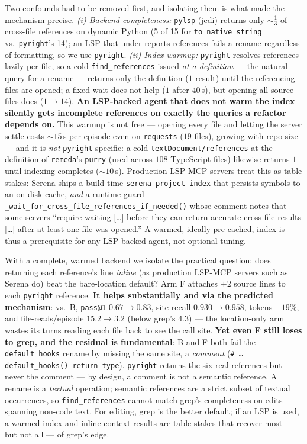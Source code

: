 \documentclass[11pt]{article}
\newcommand{\code}[1]{\texttt{#1}}
\begin{document}
Two confounds had to be removed first, and isolating them is what made the mechanism precise.
\emph{(i) Backend completeness:} \code{pylsp} (jedi) returns only ${\sim}\tfrac13$ of cross-file
references on dynamic Python (5 of 15 for \code{to\_native\_string} vs.\ \code{pyright}'s 14); an LSP
that under-reports references fails a rename regardless of formatting, so we use \code{pyright}.
\emph{(ii) Index warmup:} \code{pyright} resolves references lazily per file, so a cold
\code{find\_references} issued \emph{at a definition} --- the natural query for a rename --- returns only
the definition ($1$ result) until the referencing files are opened; a fixed wait does not help ($1$ after
$40$\,s), but opening all source files does ($1\!\to\!14$). \textbf{An LSP-backed agent that does not warm
the index silently gets incomplete references on exactly the queries a refactor depends on.} This warmup
is not free --- opening every file and letting the server settle costs ${\sim}15$\,s per episode even on
\code{requests} ($19$ files), growing with repo size --- and it is \emph{not} \code{pyright}-specific: a
cold \code{textDocument/references} at the definition of \code{remeda}'s \code{purry} (used across $108$
TypeScript files) likewise returns $1$ until indexing completes (${\sim}10$\,s). Production LSP-MCP servers
treat this as table stakes: Serena ships a build-time \code{serena project index} that persists symbols to
an on-disk cache, \emph{and} a runtime guard \code{\_wait\_for\_cross\_file\_references\_if\_needed()} whose
comment notes that some servers ``require waiting [\ldots] before they can return accurate cross-file
results [\ldots] after at least one file was opened.'' A warmed, ideally pre-cached, index is thus a
prerequisite for any LSP-backed agent, not optional tuning.

With a complete, warmed backend we isolate the practical question: does returning each reference's line
\emph{inline} (as production LSP-MCP servers such as Serena do) beat the bare-location default? Arm F
attaches $\pm 2$ source lines to each \code{pyright} reference. \textbf{It helps substantially and via the
predicted mechanism}: vs.\ B, \code{pass@1} $0.67\!\to\!0.83$, site-recall $0.930\!\to\!0.958$, tokens
$-19\%$, and file-reads/episode $15.2\!\to\!3.2$ (below grep's $4.3$) --- the location-only arm wastes its
turns reading each file back to see the call site. \textbf{Yet even F still loses to grep, and the
residual is fundamental}: B and F both fail the \code{default\_hooks} rename by missing the same site, a
\emph{comment} (\code{\# \ldots default\_hooks() return type}). \code{pyright} returns the six real
references but never the comment --- by design, a comment is not a semantic reference. A rename is a
\emph{textual} operation; semantic references are a strict subset of textual occurrences, so
\code{find\_references} cannot match grep's completeness on edits spanning non-code text. For editing,
grep is the better default; if an LSP is used, a warmed index and inline-context results are table stakes
that recover most --- but not all --- of grep's edge.
\end{document}
